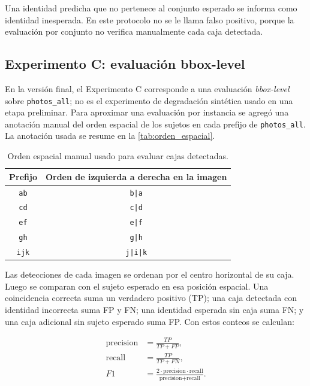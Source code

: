 \documentclass[11pt]{article}
\begin{document}
Una identidad predicha que no pertenece al conjunto esperado se informa como identidad inesperada. En este protocolo no se le llama falso positivo, porque la evaluaci\'on por conjunto no verifica manualmente cada caja detectada.

\subsection{Experimento C: evaluaci\'on bbox-level}

En la versi\'on final, el Experimento C corresponde a una evaluaci\'on \textit{bbox-level} sobre \texttt{photos\_all}; no es el experimento de degradaci\'on sint\'etica usado en una etapa preliminar. Para aproximar una evaluaci\'on por instancia se agreg\'o una anotaci\'on manual del orden espacial de los sujetos en cada prefijo de \texttt{photos\_all}. La anotaci\'on usada se resume en la \autoref{tab:orden_espacial}.

\begin{table}[H]
\centering
\caption{Orden espacial manual usado para evaluar cajas detectadas.}
\label{tab:orden_espacial}
\begin{tabular}{cc}
\toprule
Prefijo & Orden de izquierda a derecha en la imagen \\
\midrule
\texttt{ab} & \texttt{b|a} \\
\texttt{cd} & \texttt{c|d} \\
\texttt{ef} & \texttt{e|f} \\
\texttt{gh} & \texttt{g|h} \\
\texttt{ijk} & \texttt{j|i|k} \\
\bottomrule
\end{tabular}
\end{table}

Las detecciones de cada imagen se ordenan por el centro horizontal de su caja. Luego se comparan con el sujeto esperado en esa posici\'on espacial. Una coincidencia correcta suma un verdadero positivo (TP); una caja detectada con identidad incorrecta suma FP y FN; una identidad esperada sin caja suma FN; y una caja adicional sin sujeto esperado suma FP. Con estos conteos se calculan:

\begin{align}
    \text{precision} &= \frac{TP}{TP + FP},\\
    \text{recall} &= \frac{TP}{TP + FN},\\
    F1 &= \frac{2\cdot \text{precision}\cdot \text{recall}}
    {\text{precision} + \text{recall}}.
\end{align}
\end{document}
